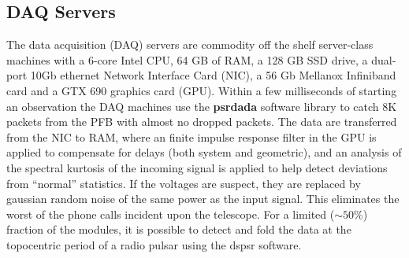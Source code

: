 \subsection {DAQ Servers}

The data acquisition (DAQ) servers are commodity off the shelf server-class machines with a 6-core Intel CPU, 64 GB of RAM, a 128 GB SSD drive, a dual-port 10Gb ethernet Network Interface Card (NIC), a 56 Gb Mellanox Infiniband card and a GTX 690 graphics card (GPU). Within a few milliseconds of starting an observation the DAQ machines use the {\bf psrdada} software library to catch 8K packets from the PFB with almost no dropped packets. The data are transferred from the NIC to RAM, where an finite impulse response filter in the GPU is applied to compensate for delays (both system and geometric), and an analysis of the spectral kurtosis of the incoming signal is applied to help detect deviations from ``normal'' statistics. If the voltages are suspect, they are replaced by gaussian random noise of the same power as the input signal. This eliminates the worst of the phone calls incident upon the telescope. For a limited ($\sim50$\%) fraction of the modules, it is possible to detect and fold the data at the topocentric period of a radio pulsar using the {\sc dspsr} software.